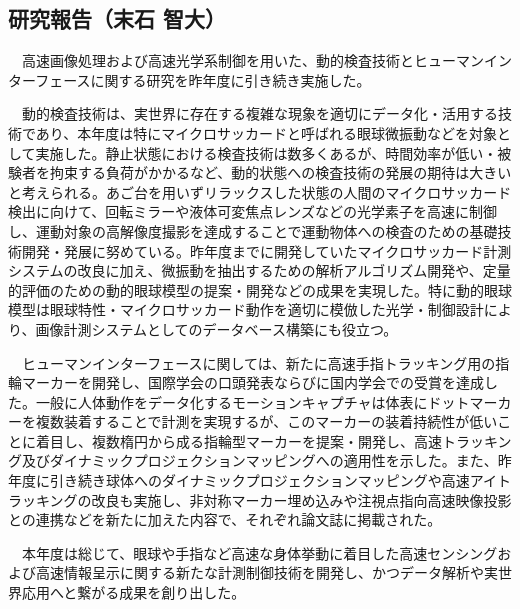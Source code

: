 \subsection{研究報告（末石 智大）}

　高速画像処理および高速光学系制御を用いた、動的検査技術とヒューマンインターフェースに関する研究を昨年度に引き続き実施した。

　動的検査技術は、実世界に存在する複雑な現象を適切にデータ化・活用する技術であり、本年度は特にマイクロサッカードと呼ばれる眼球微振動などを対象として実施した。静止状態における検査技術は数多くあるが、時間効率が低い・被験者を拘束する負荷がかかるなど、動的状態への検査技術の発展の期待は大きいと考えられる。あご台を用いずリラックスした状態の人間のマイクロサッカード検出に向けて、回転ミラーや液体可変焦点レンズなどの光学素子を高速に制御し、運動対象の高解像度撮影を達成することで運動物体への検査のための基礎技術開発・発展に努めている。昨年度までに開発していたマイクロサッカード計測システムの改良に加え、微振動を抽出するための解析アルゴリズム開発や、定量的評価のための動的眼球模型の提案・開発などの成果を実現した。特に動的眼球模型は眼球特性・マイクロサッカード動作を適切に模倣した光学・制御設計により、画像計測システムとしてのデータベース構築にも役立つ。

　ヒューマンインターフェースに関しては、新たに高速手指トラッキング用の指輪マーカーを開発し、国際学会の口頭発表ならびに国内学会での受賞を達成した。一般に人体動作をデータ化するモーションキャプチャは体表にドットマーカーを複数装着することで計測を実現するが、このマーカーの装着持続性が低いことに着目し、複数楕円から成る指輪型マーカーを提案・開発し、高速トラッキング及びダイナミックプロジェクションマッピングへの適用性を示した。また、昨年度に引き続き球体へのダイナミックプロジェクションマッピングや高速アイトラッキングの改良も実施し、非対称マーカー埋め込みや注視点指向高速映像投影との連携などを新たに加えた内容で、それぞれ論文誌に掲載された。

　本年度は総じて、眼球や手指など高速な身体挙動に着目した高速センシングおよび高速情報呈示に関する新たな計測制御技術を開発し、かつデータ解析や実世界応用へと繋がる成果を創り出した。